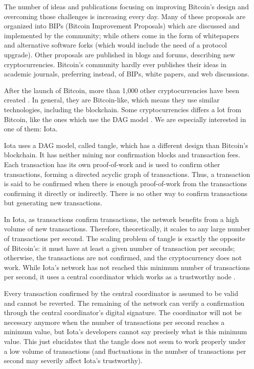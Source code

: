 The number of ideas and publications focusing on improving Bitcoin's design and overcoming those challenges is increasing every day. Many of these proposals are organized into BIPs (Bitcoin Improvement Proposals) which are discussed and implemented by the community; while others come in the form of whitepapers and alternative software forks (which would include the need of a protocol upgrade). Other proposals are published in blogs and forums, describing new cryptocurrencies. Bitcoin's community hardly ever publishes their ideas in academic journals, preferring instead, of BIPs, white papers, and web discussions.

After the launch of Bitcoin, more than 1,000 other cryptocurrencies have been created \citep{coinmarketcap}. In general, they are Bitcoin-like, which means they use similar technologies, including the blockchain. Some cryptocurrencies differs a lot from Bitcoin, like the ones which use the DAG model \citep{dagdiscussion2014, tangle2016, dagcoin2015, sompolinsky2013, lewenberg2015, vorick2015}. We are especially interested in one of them: Iota.

Iota uses a DAG model, called tangle, which has a different design than Bitcoin's blockchain. It has neither mining nor confirmation blocks and transaction fees. Each transaction has its own proof-of-work and is used to confirm other transactions, forming a directed acyclic graph of transactions. Thus, a transaction is said to be confirmed when there is enough proof-of-work from the transactions confirming it directly or indirectly. There is no other way to confirm transactions but generating new transactions.

In Iota, as transactions confirm transactions, the network benefits from a high volume of new transactions. Therefore, theoretically, it scales to any large number of transactions per second. The scaling problem of tangle is exactly the opposite of Bitcoin's: it must have at least a given number of transaction per seconds; otherwise, the transactions are not confirmed, and the cryptocurrency does not work. While Iota's network has not reached this minimum number of transactions per second, it uses a central coordinator which works as a trustworthy node \citep{iotacoordinator}.

Every transaction confirmed by the central coordinator is assumed to be valid and cannot be reverted. The remaining of the network can verify a confirmation through the central coordinator's digital signature. The coordinator will not be necessary anymore when the number of transactions per second reaches a minimum value, but Iota's developers cannot say precisely what is this minimum value. This just elucidates that the tangle does not seem to work properly under a low volume of transactions (and fluctuations in the number of transactions per second may severily affect Iota's trustworthy).

